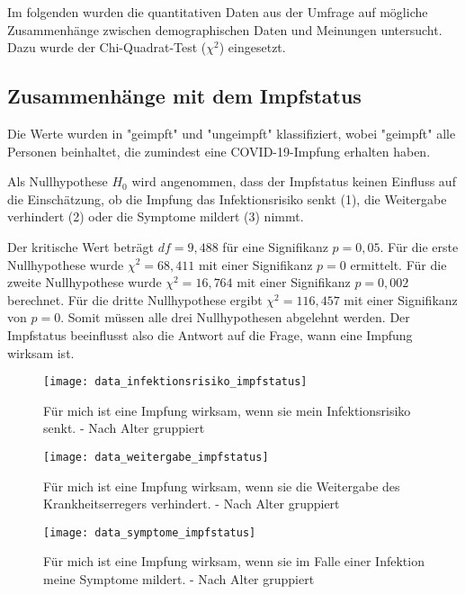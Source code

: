 Im folgenden wurden die quantitativen Daten aus der Umfrage auf mögliche Zusammenhänge zwischen demographischen Daten und Meinungen untersucht. Dazu wurde der Chi-Quadrat-Test (\(\chi^2\)) eingesetzt.

\subsection{Zusammenhänge mit dem Impfstatus}

Die Werte wurden in "geimpft" und "ungeimpft" klassifiziert, wobei "geimpft" alle Personen beinhaltet, die zumindest eine COVID-19-Impfung erhalten haben.

Als Nullhypothese \(H_0\) wird angenommen, dass der Impfstatus keinen Einfluss auf die Einschätzung, ob die Impfung das Infektionsrisiko senkt (1), die Weitergabe verhindert (2) oder die Symptome mildert (3) nimmt.

Der kritische Wert beträgt \(df = 9,488\) für eine Signifikanz \(p = 0,05\).
Für die erste Nullhypothese wurde \(\chi^2 = 68,411\) mit einer Signifikanz \(p = 0\) ermittelt. Für die zweite Nullhypothese wurde \(\chi^2 = 16,764\) mit einer Signifikanz \(p = 0,002\) berechnet. Für die dritte Nullhypothese ergibt \(\chi^2 = 116,457\) mit einer Signifikanz von \(p = 0\). Somit müssen alle drei Nullhypothesen abgelehnt werden. Der Impfstatus beeinflusst also die Antwort auf die Frage, wann eine Impfung wirksam ist.

\begin{figure}[ht]
    \caption{Für mich ist eine Impfung wirksam, wenn sie mein Infektionsrisiko senkt. - Nach Alter gruppiert}
    \label{fig:vgl_infektionsrisiko_impfstatus}
    \centering
    \texttt{[image: data\_infektionsrisiko\_impfstatus]}
\end{figure}

\begin{figure}[ht]
    \caption{Für mich ist eine Impfung wirksam, wenn sie die Weitergabe des Krankheitserregers verhindert. - Nach Alter gruppiert}
    \label{fig:vgl_weitergabe_impfstatus}
    \centering
    \texttt{[image: data\_weitergabe\_impfstatus]}
\end{figure}

\begin{figure}[ht]
    \caption{Für mich ist eine Impfung wirksam, wenn sie im Falle einer Infektion meine Symptome mildert. - Nach Alter gruppiert}
    \label{fig:vgl_symptome_impfstatus}
    \centering
    \texttt{[image: data\_symptome\_impfstatus]}
\end{figure}

